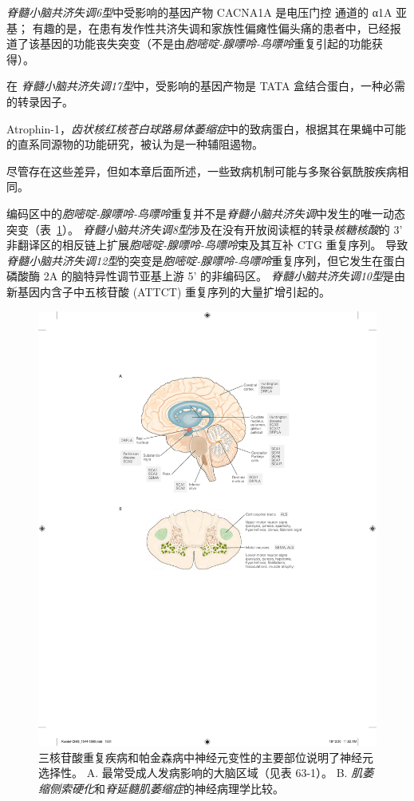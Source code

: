 \textit{脊髓小脑共济失调6型}中受影响的基因产物 CACNA1A 是电压门控  通道的 α1A 亚基；
有趣的是，在患有发作性共济失调和家族性偏瘫性偏头痛的患者中，已经报道了该基因的功能丧失突变（不是由\textit{胞嘧啶-腺嘌呤-鸟嘌呤}重复引起的功能获得）。


在 \textit{脊髓小脑共济失调17型}中，受影响的基因产物是 TATA 盒结合蛋白，一种必需的转录因子。


Atrophin-1，\textit{齿状核红核苍白球路易体萎缩症}中的致病蛋白，根据其在果蝇中可能的直系同源物的功能研究，被认为是一种辅阻遏物。


尽管存在这些差异，但如本章后面所述，一些致病机制可能与多聚谷氨酰胺疾病相同。


编码区中的\textit{胞嘧啶-腺嘌呤-鸟嘌呤}重复并不是\textit{脊髓小脑共济失调}中发生的唯一动态突变（表~\ref{fig:63_2}）。
\textit{脊髓小脑共济失调8型}涉及在没有开放阅读框的转录\textit{核糖核酸}的 3' 非翻译区的相反链上扩展\textit{胞嘧啶-腺嘌呤-鸟嘌呤}束及其互补 CTG 重复序列。
导致\textit{脊髓小脑共济失调12型}的突变是\textit{胞嘧啶-腺嘌呤-鸟嘌呤}重复序列，但它发生在蛋白磷酸酶 2A 的脑特异性调节亚基上游 5' 的非编码区。
\textit{脊髓小脑共济失调10型}是由新基因内含子中五核苷酸 (ATTCT) 重复序列的大量扩增引起的。


\begin{figure}[htbp]
	\centering
	\includegraphics[width=0.7\linewidth]{chap63/fig_63_2}
	\caption{三核苷酸重复疾病和帕金森病中神经元变性的主要部位说明了神经元选择性。
		A. 最常受成人发病影响的大脑区域（见表 63-1）。
		B. \textit{肌萎缩侧索硬化}和\textit{脊延髓肌萎缩症}的神经病理学比较。}
	\label{fig:63_2}
\end{figure}


